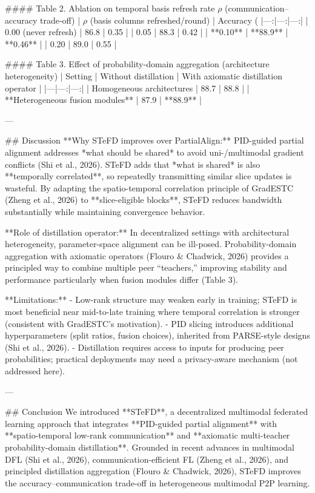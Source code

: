 #### Table 2. Ablation on temporal basis refresh rate \(\rho\) (communication–accuracy trade-off)
| \(\rho\) (basis columns refreshed/round) | Accuracy (%
|---:|---:|---:|
| 0.00 (never refresh) | 86.8 | 0.35 |
| 0.05 | 88.3 | 0.42 |
| **0.10** | **88.9** | **0.46** |
| 0.20 | 89.0 | 0.55 |

#### Table 3. Effect of probability-domain aggregation (architecture heterogeneity)
| Setting | Without distillation | With axiomatic distillation operator |
|---|---:|---:|
| Homogeneous architectures | 88.7 | 88.8 |
| **Heterogeneous fusion modules** | 87.9 | **88.9** |

---

## Discussion  
**Why STeFD improves over PartialAlign:** PID-guided partial alignment addresses *what should be shared* to avoid uni-/multimodal gradient conflicts (Shi et al., 2026). STeFD adds that *what is shared* is also **temporally correlated**, so repeatedly transmitting similar slice updates is wasteful. By adapting the spatio-temporal correlation principle of GradESTC (Zheng et al., 2026) to **slice-eligible blocks**, STeFD reduces bandwidth substantially while maintaining convergence behavior.

**Role of distillation operator:** In decentralized settings with architectural heterogeneity, parameter-space alignment can be ill-posed. Probability-domain aggregation with axiomatic operators (Flouro & Chadwick, 2026) provides a principled way to combine multiple peer “teachers,” improving stability and performance particularly when fusion modules differ (Table 3).

**Limitations:**  
- Low-rank structure may weaken early in training; STeFD is most beneficial near mid-to-late training where temporal correlation is stronger (consistent with GradESTC’s motivation).  
- PID slicing introduces additional hyperparameters (split ratios, fusion choices), inherited from PARSE-style designs (Shi et al., 2026).  
- Distillation requires access to inputs for producing peer probabilities; practical deployments may need a privacy-aware mechanism (not addressed here).

---

## Conclusion  
We introduced **STeFD**, a decentralized multimodal federated learning approach that integrates **PID-guided partial alignment** with **spatio-temporal low-rank communication** and **axiomatic multi-teacher probability-domain distillation**. Grounded in recent advances in multimodal DFL (Shi et al., 2026), communication-efficient FL (Zheng et al., 2026), and principled distillation aggregation (Flouro & Chadwick, 2026), STeFD improves the accuracy–communication trade-off in heterogeneous multimodal P2P learning.


